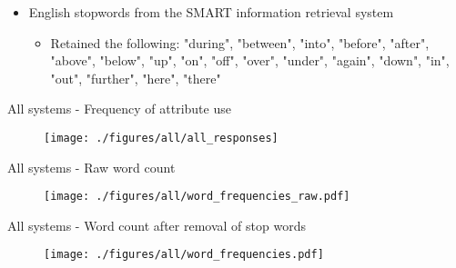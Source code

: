 \documentclass[11pt]{beamer}
\begin{document}

\begin{frame}
\begin{itemize}
\item{English stopwords from the SMART information retrieval system}
\begin{itemize}
\item{Retained the following: "during", "between", "into", "before", "after", "above", "below", "up", "on", "off", "over", "under", "again", "down", "in", "out", "further", "here", "there"}
\end{itemize}
\end{itemize}

\end{frame}


\begin{frame}{All systems - Frequency of attribute use}
\begin{figure}
\texttt{[image: ./figures/all/all\_responses]}
\end{figure}
\end{frame}

\begin{frame}{All systems - Raw word count}
\begin{figure}
\texttt{[image: ./figures/all/word\_frequencies\_raw.pdf]}
\end{figure}
\end{frame}

\begin{frame}{All systems - Word count after removal of stop words}
\begin{figure}
\texttt{[image: ./figures/all/word\_frequencies.pdf]}
\end{figure}
\end{frame}
\end{document}
